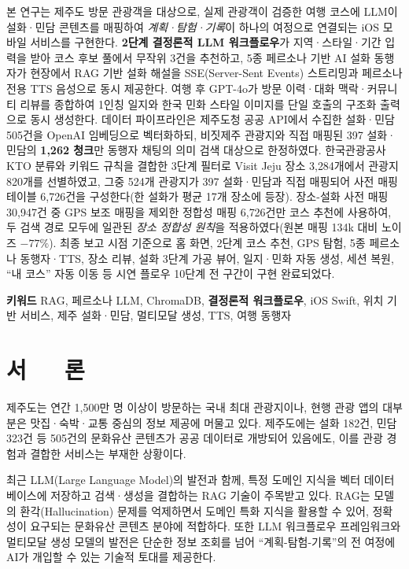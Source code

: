 \documentclass[10pt,twocolumn,a4paper]{article}
\begin{document}
{\small\noindent
본 연구는 제주도 방문 관광객을 대상으로, 실제 관광객이 검증한 여행 코스에
LLM이 설화·민담 콘텐츠를 매핑하여 \emph{계획·탐험·기록}이 하나의 여정으로
연결되는 iOS 모바일 서비스를 구현한다. \textbf{2단계 결정론적 LLM 워크플로우}가
지역·스타일·기간 입력을 받아 코스 후보 풀에서 무작위 3건을
추천하고, 5종 페르소나 기반 AI 설화 동행자가 현장에서 RAG 기반 설화 해설을
SSE(Server-Sent Events) 스트리밍과 페르소나 전용 TTS 음성으로 동시 제공한다.
여행 후 GPT-4o가 방문 이력·대화 맥락·커뮤니티 리뷰를 종합하여 1인칭 일지와
한국 민화 스타일 이미지를 단일 호출의 구조화 출력으로 동시 생성한다.
데이터 파이프라인은 제주도청 공공 API에서 수집한 설화·민담 505건을 OpenAI
임베딩으로 벡터화하되, 비짓제주 관광지와 직접 매핑된 397 설화·민담의 \textbf{1{,}262
청크}만 동행자 채팅의 의미 검색 대상으로 한정하였다. 한국관광공사 KTO 분류와 키워드 규칙을 결합한
3단계 필터로 Visit Jeju 장소 3{,}284개에서 관광지 820개를 선별하였고, 그중 524개
관광지가 397 설화·민담과 직접 매핑되어 사전 매핑 테이블 6{,}726건을 구성한다(한
설화가 평균 17개 장소에 등장). 장소-설화 사전 매핑 30{,}947건 중 GPS 보조 매핑을
제외한 정합성 매핑 6{,}726건만 코스 추천에 사용하여, 두 검색 경로 모두에 일관된
\emph{장소 정합성 원칙}을 적용하였다(원본 매핑 134k 대비 노이즈 $-77\%$). 최종 보고 시점 기준으로 홈 화면,
2단계 코스 추천, GPS 탐험, 5종 페르소나 동행자·TTS, 장소 리뷰, 설화 3단계
가공 뷰어, 일지·민화 자동 생성, 세션 복원, ``내 코스'' 자동 이동 등 시연
플로우 10단계 전 구간이 구현 완료되었다.}

\vspace{6pt}
{\small\noindent\textbf{키워드}\quad
RAG, 페르소나 LLM, ChromaDB, \textbf{결정론적 워크플로우}, iOS Swift, 위치 기반 서비스,
제주 설화·민담, 멀티모달 생성, TTS, 여행 동행자}

\vspace{8pt}

\section{서~~~론}

제주도는 연간 1{,}500만 명 이상이 방문하는 국내 최대 관광지이나, 현행 관광
앱의 대부분은 맛집·숙박·교통 중심의 정보 제공에 머물고 있다. 제주도에는
설화 182건, 민담 323건 등 505건의 문화유산 콘텐츠가 공공 데이터로 개방되어
있음에도, 이를 관광 경험과 결합한 서비스는 부재한 상황이다.

최근 LLM(Large Language Model)의 발전과 함께, 특정 도메인 지식을 벡터
데이터베이스에 저장하고 검색·생성을 결합하는 RAG 기술이 주목받고 있다.
RAG는 모델의 환각(Hallucination) 문제를 억제하면서 도메인 특화 지식을
활용할 수 있어, 정확성이 요구되는 문화유산 콘텐츠 분야에 적합하다. 또한
LLM 워크플로우 프레임워크와 멀티모달 생성 모델의 발전은 단순한 정보
조회를 넘어 ``계획-탐험-기록''의 전 여정에 AI가 개입할 수 있는 기술적
토대를 제공한다.
\end{document}
